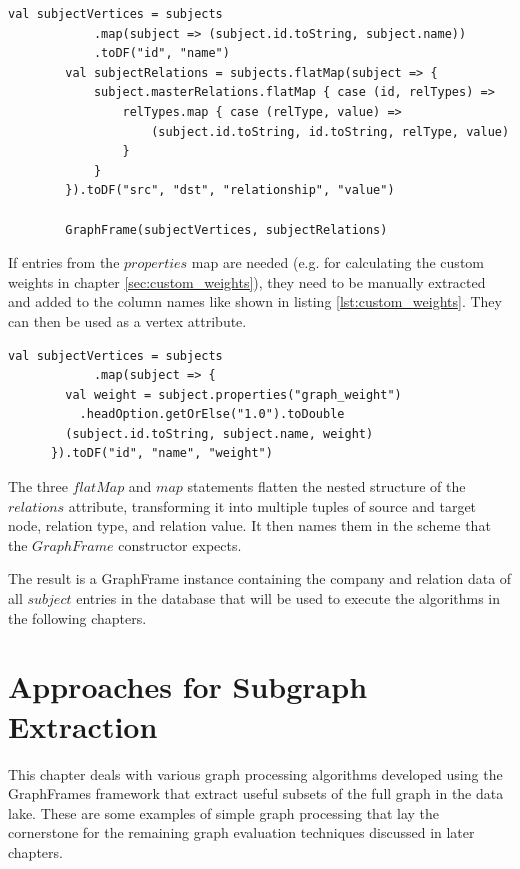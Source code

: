 \documentclass[
        a4paper,     %
        titlepage,   %
        oneside,     %
        parskip      %
]{scrartcl}          %
\begin{document}
    \begin{lstlisting}[style=scalaStyle,caption=extractGraph in $GraphExtractor$]
		val subjectVertices = subjects
			.map(subject => (subject.id.toString, subject.name))
			.toDF("id", "name")
		val subjectRelations = subjects.flatMap(subject => {
			subject.masterRelations.flatMap { case (id, relTypes) =>
				relTypes.map { case (relType, value) =>
					(subject.id.toString, id.toString, relType, value)
				}
			}
		}).toDF("src", "dst", "relationship", "value")

		GraphFrame(subjectVertices, subjectRelations)
    \end{lstlisting}

    If entries from the $properties$ map are needed (e.g. for calculating the custom weights in
    chapter \ref{sec:custom_weights}), they need to be manually extracted
    and added to the column names like shown in listing \ref{lst:custom_weights}.
    They can then be used as a vertex attribute.
    \begin{lstlisting}[style=scalaStyle,caption=Custom weight extraction,label=lst:custom_weights]
		val subjectVertices = subjects
			.map(subject => {
        val weight = subject.properties("graph_weight")
          .headOption.getOrElse("1.0").toDouble
        (subject.id.toString, subject.name, weight)
      }).toDF("id", "name", "weight")
    \end{lstlisting}

    The three $flatMap$ and $map$ statements flatten the nested structure of the $relations$ attribute,
    transforming it into multiple tuples of source and target node, relation type, and relation value.
    It then names them in the scheme that the $GraphFrame$ constructor expects.

    The result is a GraphFrame instance containing the company and relation data of all $subject$
    entries in the database that will be used to execute the algorithms in the following chapters.
    \pagebreak

  \section{Approaches for Subgraph Extraction}
  \label{sec:subgraph_extraction}
  This chapter deals with various graph processing algorithms developed using the
  GraphFrames framework that extract useful subsets of the full graph in the data lake.
  These are some examples of simple graph processing that lay the cornerstone
  for the remaining graph evaluation techniques discussed in later chapters.
\end{document}

